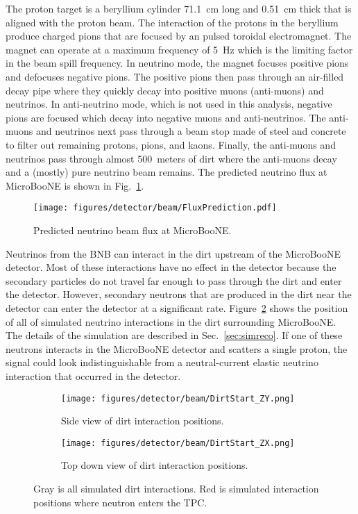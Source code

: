     The proton target is a beryllium cylinder 71.1~cm long and 0.51~cm thick
    that is aligned with the proton beam. The interaction of the protons in the
    beryllium produce charged pions that are focused by an pulsed toroidal
    electromagnet. The magnet can operate at a maximum frequency of 5~Hz which
    is the limiting factor in the beam spill frequency. In neutrino mode, the
    magnet focuses positive pions and defocuses negative pions. The positive
    pions then pass through an air-filled decay pipe where they quickly decay
    into positive muons (anti-muons) and neutrinos. In anti-neutrino mode,
    which is not used in this analysis, negative pions are focused which decay
    into negative muons and anti-neutrinos. The anti-muons and neutrinos next
    pass through a beam stop made of steel and concrete to filter out remaining
    protons, pions, and kaons. Finally, the anti-muons and neutrinos pass
    through almost 500~meters of dirt where the anti-muons decay and a (mostly)
    pure neutrino beam remains. The predicted neutrino flux at MicroBooNE is
    shown in Fig.~\ref{fig:beamflux}.

    \begin{figure}[h]
      \centering
      \texttt{[image: figures/detector/beam/FluxPrediction.pdf]}
      \caption{Predicted neutrino beam flux at MicroBooNE.}
      \label{fig:beamflux}
    \end{figure}

    Neutrinos from the BNB can interact in the dirt upstream of the MicroBooNE
    detector. Most of these interactions have no effect in the detector because
    the secondary particles do not travel far enough to pass through the dirt
    and enter the detector. However, secondary neutrons that are produced in
    the dirt near the detector can enter the detector at a significant rate.
    Figure~\ref{fig:dirtstart} shows the position of all of simulated neutrino
    interactions in the dirt surrounding MicroBooNE. The details of the
    simulation are described in Sec.~\ref{sec:simreco}. If one of these
    neutrons interacts in the MicroBooNE detector and scatters a single proton,
    the signal could look indistinguishable from a neutral-current elastic
    neutrino interaction that occurred in the detector.

    \begin{figure}[h]
      \centering
      \begin{subfigure}{2.5in}
        \texttt{[image: figures/detector/beam/DirtStart\_ZY.png]}
        \caption{Side view of dirt interaction positions.}
      \end{subfigure}
      \hspace{2pt}
      \begin{subfigure}{2.5in}
        \texttt{[image: figures/detector/beam/DirtStart\_ZX.png]}
        \caption{Top down view of dirt interaction positions.}
      \end{subfigure}
      \caption{Gray is all simulated dirt interactions. Red is simulated
      interaction positions where neutron enters the TPC.}
      \label{fig:dirtstart}
    \end{figure}

